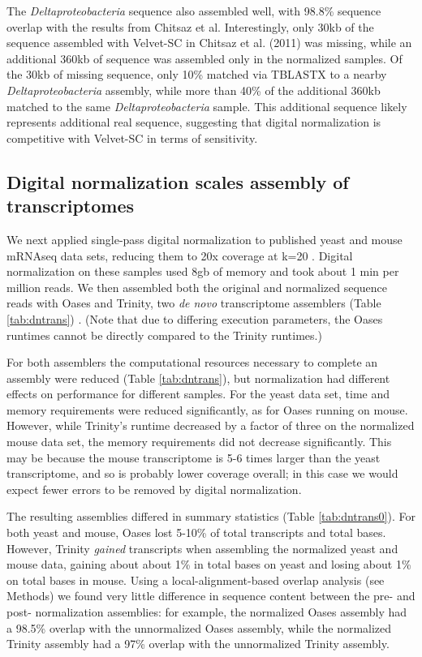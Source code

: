 \documentclass[10pt]{article}
\begin{document}
The {\em Deltaproteobacteria} sequence also assembled well, with
98.8\% sequence overlap with the results from Chitsaz et al.
Interestingly, only 30kb of the sequence assembled with Velvet-SC in
Chitsaz et al. (2011) was missing, while an additional 360kb of
sequence was assembled only in the normalized samples.  Of the 30kb of
missing sequence, only 10\% matched via TBLASTX to a nearby {\em
  Deltaproteobacteria} assembly, while more than 40\% of the
additional 360kb matched to the same {\em Deltaproteobacteria} sample.
This additional sequence likely represents additional real
sequence, suggesting that digital normalization is competitive with
Velvet-SC in terms of sensitivity.


\subsection*{Digital normalization scales assembly of transcriptomes}

We next applied single-pass digital normalization to published yeast
and mouse mRNAseq data sets, reducing them to 20x coverage at k=20
\cite{pubmed21572440}.  Digital normalization on these samples used
8gb of memory and took about 1 min per million reads.  We then
assembled both the original and normalized sequence reads with Oases
and Trinity, two {\em de novo} transcriptome assemblers (Table
\ref{tab:dntrans}) \cite{pubmed22368243,pubmed21572440}.  (Note that
due to differing execution parameters, the Oases runtimes cannot be
directly compared to the Trinity runtimes.)

For both assemblers the computational resources necessary to complete
an assembly were reduced (Table \ref{tab:dntrans}), but normalization
had different effects on performance for different samples.  For the
yeast data set, time and memory requirements were reduced
significantly, as for Oases running on mouse.  However, while
Trinity's runtime decreased by a factor of three on the normalized
mouse data set, the memory requirements did not decrease
significantly.  This may be because the mouse transcriptome is 5-6
times larger than the yeast transcriptome, and so is probably lower
coverage overall; in this case we would expect fewer errors to be removed
by digital normalization.

The resulting assemblies differed in summary statistics (Table
\ref{tab:dntrans0}).  For both yeast and mouse, Oases lost 5-10\% of
total transcripts and total bases.  However, Trinity {\em gained}
transcripts when assembling the normalized yeast and mouse data,
gaining about about 1\% in total bases on yeast and losing about 1\%
on total bases in mouse.  Using a local-alignment-based overlap
analysis (see Methods) we found very little difference in sequence
content between the pre- and post- normalization assemblies: for
example, the normalized Oases assembly had a 98.5\% overlap with the
unnormalized Oases assembly, while the normalized Trinity assembly had
a 97\% overlap with the unnormalized Trinity assembly.
\end{document}
